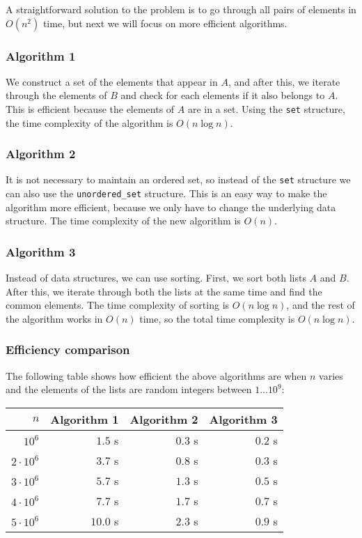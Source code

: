 A straightforward solution to the problem is
to go through all pairs of elements in $O(n^2)$ time,
but next we will focus on
more efficient algorithms.

\subsubsection{Algorithm 1}

We construct a set of the elements that appear in $A$,
and after this, we iterate through the elements
of $B$ and check for each elements if it
also belongs to $A$.
This is efficient because the elements of $A$
are in a set.
Using the \texttt{set} structure,
the time complexity of the algorithm is $O(n \log n)$.

\subsubsection{Algorithm 2}

It is not necessary to maintain an ordered set,
so instead of the \texttt{set} structure
we can also use the \texttt{unordered\_set} structure.
This is an easy way to make the algorithm
more efficient, because we only have to change
the underlying data structure.
The time complexity of the new algorithm is $O(n)$.

\subsubsection{Algorithm 3}

Instead of data structures, we can use sorting.
First, we sort both lists $A$ and $B$.
After this, we iterate through both the lists
at the same time and find the common elements.
The time complexity of sorting is $O(n \log n)$,
and the rest of the algorithm works in $O(n)$ time,
so the total time complexity is $O(n \log n)$.

\subsubsection{Efficiency comparison}

The following table shows how efficient
the above algorithms are when $n$ varies and
the elements of the lists are random
integers between $1 \ldots 10^9$:

\begin{center}
\begin{tabular}{rrrr}
$n$ & Algorithm 1 & Algorithm 2 & Algorithm 3 \\
\hline
$10^6$ & $1.5$ s & $0.3$ s & $0.2$ s \\
$2 \cdot 10^6$ & $3.7$ s & $0.8$ s & $0.3$ s \\
$3 \cdot 10^6$ & $5.7$ s & $1.3$ s & $0.5$ s \\
$4 \cdot 10^6$ & $7.7$ s & $1.7$ s & $0.7$ s \\
$5 \cdot 10^6$ & $10.0$ s & $2.3$ s & $0.9$ s \\
\end{tabular}
\end{center}

